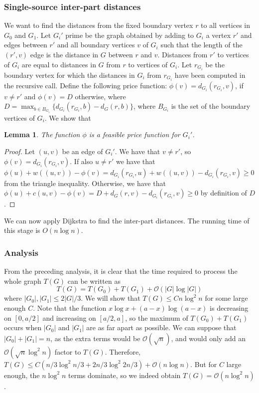 \documentclass[11pt]{article}
\newtheorem{lemma}[theorem]{Lemma}
\begin{document}
\subsubsection{Single-source inter-part distances}

We want to find the distances from the fixed boundary vertex $r$ to all vertices in $G_0$ and $G_1$. Let $G_i'$ prime be the graph obtained by adding to $G_i$ a vertex $r'$ and edges between $r'$ and all boundary vertices $v$ of $G_i$ such that the length of the $(r',v)$ edge is the distance in $G$ between $r$ and $v$. Distances from $r'$ to vertices of $G_i$ are equal to distances in $G$ from $r$ to vertices of $G_i$. Let $r_{G_i}$ be the boundary vertex for which the distances in $G_i$ from $r_{G_i}$ have been computed in the recursive call. Define the following price function: $\phi(v) = d_{G_i}(r_{G_i},v)$, if $v\neq r'$ and $\phi(v) = D$ otherwise, where $D = \max_{b\in B_{G_i}}\{d_{G_i}(r_{G_i},b)-d_G(r,b)\}$, where $B_{G_i}$ is the set of the boundary vertices of $G_i$. We show that\\

\begin{lemma}
The function $\phi$ is a feasible price function for $G_i'$.
\end{lemma}

\begin{proof}
Let $(u,v)$ be an edge of $G_i'$. We have that $v\neq r'$, so $\phi(v) = d_{G_i}(r_{G_i},v)$. If also $u\neq r'$ we have that $\phi(u) + w((u,v)) -\phi(v) = d_{G_i}(r_{G_i},u) + w((u,v)) - d_{G_i}(r_{G_i},v)\geq 0$ from the triangle inequality. Otherwise, we have that $\phi(u)+c(u,v)-\phi(v) = D + d_G(r,v) - d_{G_i}(r_{G_i},v)\geq 0$ by definition of $D$.
\end{proof}

We can now apply Dijkstra to find the inter-part distances. The running time of this stage is $O(n \log n)$.

\subsubsection{Analysis}
\label{sec:analysis-neg}

From the preceding analysis, it is clear that the time required to process the whole graph $T(G)$ can be written as 
\[
  T(G) = T(G_0) + T(G_1) + \mathcal{O}(|G| \log |G|)
\]
where $|G_0|, |G_1|\leq 2|G|/3$. We will show that $T(G) \leq Cn \log^2 n$ for some large enough $C$. Note that the function $x\log x + (a-x)\log (a-x)$ is decreasing on $[0,a/2]$ and increasing on $[a/2,a]$, so the maximum of $T(G_0)+T(G_1)$ occurs when $|G_0|$ and $|G_1|$ are as far apart as possible. We can suppose that $|G_0|+|G_1| = n$, as the extra terms would be $\mathcal{O}(\sqrt{n})$, and would only add an $\mathcal{O}(\sqrt{n}\log^2 n)$ factor to $T(G)$. Therefore, $T(G)\leq C(n/3\log^2 n/3 + 2n/3\log^2 2n/3) + \mathcal{O}(n\log n)$. But for $C$ large enough, the $n \log^2 n$ terms dominate, so we indeed obtain $T(G) = \mathcal{O}(n\log^2 n)$.
\end{document}

